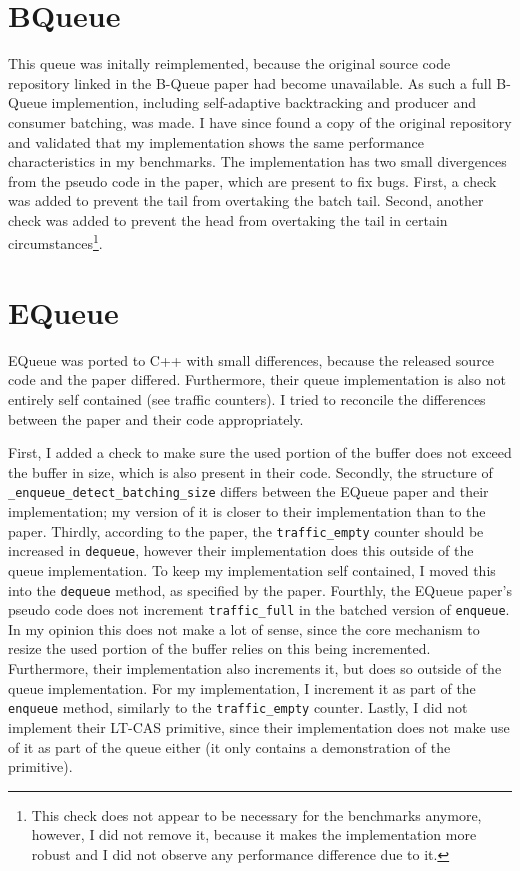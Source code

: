 


\section{BQueue}
This queue was initally reimplemented, because the original source code repository linked in the B-Queue
paper had become unavailable\cite{B-Queue}.
As such a full B-Queue implemention, including self-adaptive backtracking and producer and consumer batching, was made.
I have since found a copy of the original repository and validated that my implementation shows the same
performance characteristics in my benchmarks.
The implementation has two small divergences from the pseudo code in the paper, which are present to fix bugs.
First, a check was added to prevent the tail from overtaking the batch tail.
Second, another check was added to prevent the head from overtaking the tail in certain circumstances\footnote{
    This check does not appear to be necessary for the benchmarks anymore, however, I did not remove it,
because it makes the implementation more robust and I did not observe any performance difference due to it.}.

\section{EQueue}
EQueue was ported to C++ with small differences, because the released source code and the paper differed\cite{EQueue}.
Furthermore, their queue implementation is also not entirely self contained (see traffic counters).
I tried to reconcile the differences between the paper and their code appropriately.

First, I added a check to make sure the used portion of the buffer does not exceed the buffer in size, which
is also present in their code.
Secondly, the structure of \texttt{\_enqueue\_detect\_batching\_size} differs between the EQueue paper and
their implementation; my version of it is closer to their implementation than to the paper.
Thirdly, according to the paper, the \texttt{traffic\_empty} counter should be increased in \texttt{dequeue},
however their implementation does this outside of the queue implementation.
To keep my implementation self contained, I moved this into the \texttt{dequeue} method, as specified by the paper.
Fourthly, the EQueue paper's pseudo code does not increment \texttt{traffic\_full} in the batched version of
\texttt{enqueue}.
In my opinion this does not make a lot of sense, since the core mechanism to resize the used portion of the
buffer relies on this being incremented.
Furthermore, their implementation also increments it, but does so outside of the queue implementation.
For my implementation, I increment it as part of the \texttt{enqueue} method, similarly to the
\texttt{traffic\_empty} counter.
Lastly, I did not implement their LT-CAS primitive, since their implementation does not make use of it as
part of the queue either (it only contains a demonstration of the primitive).

